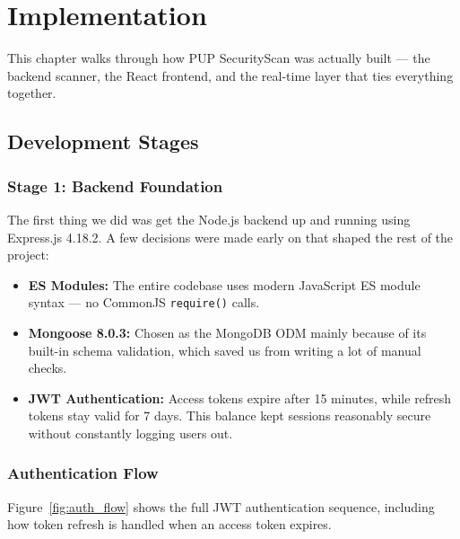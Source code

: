 \documentclass[12pt,a4paper]{report}
\begin{document}
\chapter{Implementation}
\label{chap:implementation}

This chapter walks through how PUP SecurityScan was actually built — 
the backend scanner, the React frontend, and the real-time layer that 
ties everything together.

\section{Development Stages}

\subsection{Stage 1: Backend Foundation}

The first thing we did was get the Node.js backend up and running 
using Express.js 4.18.2. A few decisions were made early on that 
shaped the rest of the project:

\begin{itemize}
    \item \textbf{ES Modules:} The entire codebase uses modern 
    JavaScript ES module syntax — no CommonJS \texttt{require()} calls.

    \item \textbf{Mongoose 8.0.3:} Chosen as the MongoDB ODM mainly 
    because of its built-in schema validation, which saved us from 
    writing a lot of manual checks.

    \item \textbf{JWT Authentication:} Access tokens expire after 
    15 minutes, while refresh tokens stay valid for 7 days. This 
    balance kept sessions reasonably secure without constantly 
    logging users out.
\end{itemize}
\clearpage
\subsection{Authentication Flow}

Figure~\ref{fig:auth_flow} shows the full JWT authentication sequence, 
including how token refresh is handled when an access token expires.
\vspace{1cm}
\end{document}
